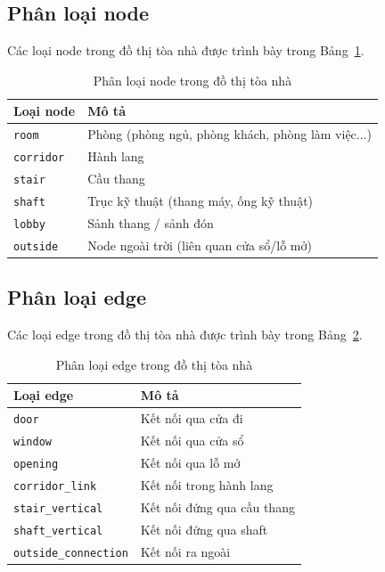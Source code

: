 \subsection{Phân loại node}

Các loại node trong đồ thị tòa nhà được trình bày trong Bảng~\ref{tab:node_types}.

\begin{table}[H]
\centering
\caption{Phân loại node trong đồ thị tòa nhà}
\label{tab:node_types}
\begin{tabular}{l l}
\toprule
\textbf{Loại node} & \textbf{Mô tả} \\
\midrule
\texttt{room}     & Phòng (phòng ngủ, phòng khách, phòng làm việc...) \\
\texttt{corridor} & Hành lang \\
\texttt{stair}    & Cầu thang \\
\texttt{shaft}    & Trục kỹ thuật (thang máy, ống kỹ thuật) \\
\texttt{lobby}    & Sảnh thang / sảnh đón \\
\texttt{outside}  & Node ngoài trời (liên quan cửa sổ/lỗ mở) \\
\bottomrule
\end{tabular}
\end{table}

\subsection{Phân loại edge}

Các loại edge trong đồ thị tòa nhà được trình bày trong Bảng~\ref{tab:edge_types}.

\begin{table}[H]
\centering
\caption{Phân loại edge trong đồ thị tòa nhà}
\label{tab:edge_types}
\begin{tabular}{l l}
\toprule
\textbf{Loại edge} & \textbf{Mô tả} \\
\midrule
\texttt{door}               & Kết nối qua cửa đi \\
\texttt{window}             & Kết nối qua cửa sổ \\
\texttt{opening}            & Kết nối qua lỗ mở \\
\texttt{corridor\_link}     & Kết nối trong hành lang \\
\texttt{stair\_vertical}    & Kết nối đứng qua cầu thang \\
\texttt{shaft\_vertical}    & Kết nối đứng qua shaft \\
\texttt{outside\_connection} & Kết nối ra ngoài \\
\bottomrule
\end{tabular}
\end{table}

